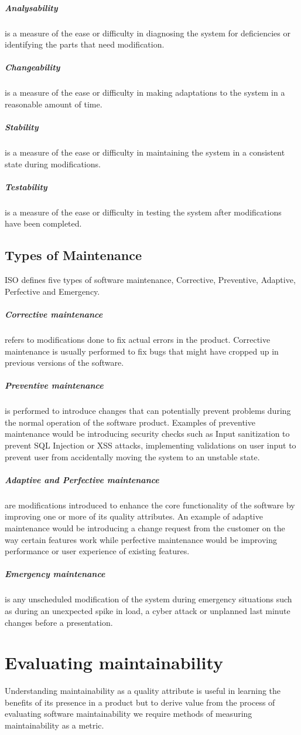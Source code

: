 \documentclass[15pt]{article}
\begin{document}
\subparagraph{Analysability} is a measure of the ease or difficulty in diagnosing the system for deficiencies or identifying the parts that need modification.

\subparagraph{Changeability} is a measure of the ease or difficulty in making adaptations to the system in a reasonable amount of time.

\subparagraph{Stability} is a measure of the ease or difficulty in maintaining the system in a consistent state during modifications.

\subparagraph{Testability} is a measure of the ease or difficulty in testing the system after modifications have been completed.

\subsection{Types of Maintenance}
ISO defines five types of software maintenance, Corrective, Preventive, Adaptive, Perfective and Emergency. \\

\subparagraph{Corrective maintenance} refers to modifications done to fix actual errors in the product. Corrective maintenance is usually performed to fix bugs that might have cropped up in previous versions of the software. 

\subparagraph{Preventive maintenance} is performed to introduce changes that can potentially prevent problems during the normal operation of the software product. Examples of preventive maintenance would be introducing security checks such as Input sanitization to prevent SQL Injection or XSS attacks, implementing validations on user input to prevent user from accidentally moving the system to an unstable state. 

\subparagraph{Adaptive and Perfective maintenance} are modifications introduced to enhance the core functionality of the software by improving one or more of its quality attributes. An example of adaptive maintenance would be introducing a change request from the customer on the way certain features work while perfective maintenance would be improving performance or user experience of existing features.

\subparagraph{Emergency maintenance} is any unscheduled modification of the system during emergency situations such as during an unexpected spike in load, a cyber attack or unplanned last minute changes before a presentation.

\section{Evaluating maintainability}
Understanding maintainability as a quality attribute is useful in learning the benefits of its presence in a product but to derive value from the process of evaluating software maintainability we require methods of measuring maintainability as a metric.
\end{document}
